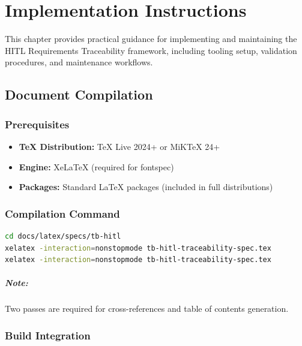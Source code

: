 \chapter{Implementation Instructions}
\label{ch:implementation-instructions}

This chapter provides practical guidance for implementing and maintaining
the HITL Requirements Traceability framework, including tooling setup,
validation procedures, and maintenance workflows.

\section{Document Compilation}
\label{sec:document-compilation}

\subsection{Prerequisites}

\begin{itemize}[noitemsep]
  \item \textbf{TeX Distribution:} TeX Live 2024+ or MiKTeX 24+
  \item \textbf{Engine:} XeLaTeX (required for fontspec)
  \item \textbf{Packages:} Standard LaTeX packages (included in full distributions)
\end{itemize}

\subsection{Compilation Command}

\begin{lstlisting}[language=bash,basicstyle=\ttfamily\small]
cd docs/latex/specs/tb-hitl
xelatex -interaction=nonstopmode tb-hitl-traceability-spec.tex
xelatex -interaction=nonstopmode tb-hitl-traceability-spec.tex
\end{lstlisting}

\paragraph{Note:} Two passes are required for cross-references and
table of contents generation.

\subsection{Build Integration}

